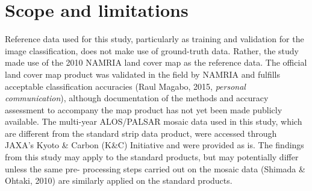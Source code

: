 \section{Scope and limitations}
\label{sec: litrev-scope-limitations}

Reference data used for this study, particularly as training and validation for the image classification, does not make use of ground-truth data. Rather, the study made use of the 2010 NAMRIA land cover map as the reference data. The official land cover map product was validated in the field by NAMRIA and fulfills acceptable classification accuracies (Raul Magabo, 2015, \textit{personal communication}), although documentation of the methods and accuracy assessment to accompany the map product has not yet been made publicly available. The multi-year ALOS/PALSAR mosaic data used in this study, which are different from the standard strip data product, were accessed through JAXA's Kyoto \& Carbon (K\&C) Initiative and were provided as is. The findings from this study may apply to the standard products, but may potentially differ unless the same pre- processing steps carried out on the mosaic data (Shimada \& Ohtaki, 2010) are similarly applied on the standard products.
